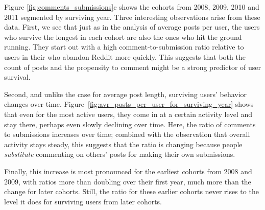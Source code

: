 Figure \ref{fig:comments_submissions}c shows the cohorts from 2008, 2009, 2010 and 2011 segmented by surviving year.  Three interesting observations arise from these data.  First, we see that just as in the analysis of average posts per user, the users who survive the longest in each cohort are also the ones who hit the ground running.  They start out with a high comment-to-submission ratio relative to users in their who abandon Reddit more quickly.  This suggests that both the count of posts and the propensity to comment might be a strong predictor of user survival.

Second, and unlike the case for average post length, surviving users' behavior changes over time.  Figure~\ref{fig:avr_posts_per_user_for_surviving_year} shows that even for the most active users, they come in at a certain activity level and stay there, perhaps even slowly declining over time.  Here, the ratio of comments to submissions increases over time; combined with the observation that overall activity stays steady, this suggests that the ratio is changing because people \textit{substitute} commenting on others' posts for making their own submissions.

Finally, this increase is most pronounced for the earliest cohorts from 2008 and 2009, with ratios more than doubling over their first year, much more than the change for later cohorts.  Still, the ratio for these earlier cohorts never rises to the level it does for surviving users from later cohorts.  

 


